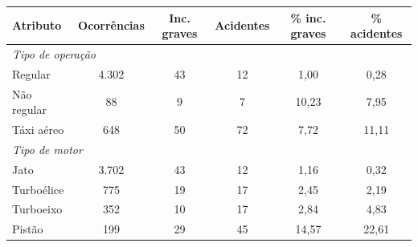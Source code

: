 \begin{tabular}{lccccc}
\toprule
\textbf{Atributo} & \textbf{Ocorrências} & \textbf{Inc. graves} & \textbf{Acidentes} & \textbf{\% inc. graves} & \textbf{\% acidentes} \\
\midrule
\multicolumn{6}{l}{\textit{Tipo de operação}} \\
\hspace{1em}Regular & 4.302 & 43 & 12 & 1,00 & 0,28 \\
\hspace{1em}Não regular & 88 & 9 & 7 & 10,23 & 7,95 \\
\hspace{1em}Táxi aéreo & 648 & 50 & 72 & 7,72 & 11,11 \\
\multicolumn{6}{l}{\textit{Tipo de motor}} \\
\hspace{1em}Jato & 3.702 & 43 & 12 & 1,16 & 0,32 \\
\hspace{1em}Turboélice & 775 & 19 & 17 & 2,45 & 2,19 \\
\hspace{1em}Turboeixo & 352 & 10 & 17 & 2,84 & 4,83 \\
\hspace{1em}Pistão & 199 & 29 & 45 & 14,57 & 22,61 \\
\bottomrule
\end{tabular}
